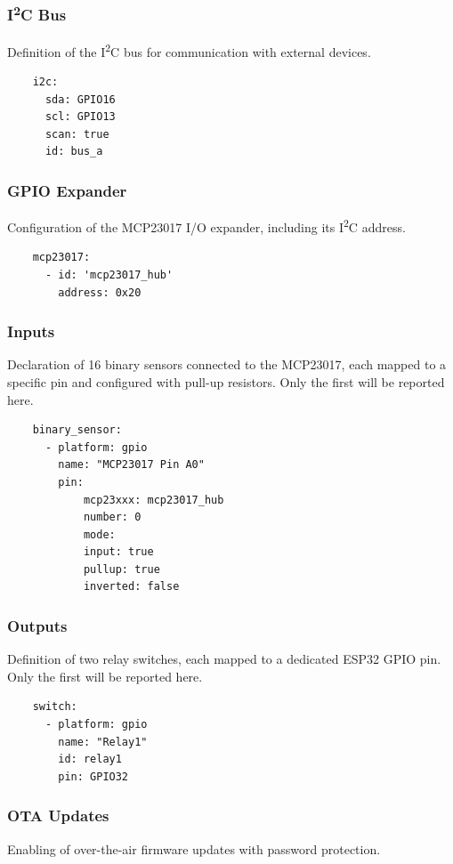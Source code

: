 \documentclass[a4paper,12pt]{article}
\begin{document}
\subsubsection{I\textsuperscript{2}C Bus}
Definition of the I\textsuperscript{2}C bus for communication with external devices.

\begin{lstlisting}
    i2c:
      sda: GPIO16
      scl: GPIO13
      scan: true
      id: bus_a
\end{lstlisting}

\subsubsection{GPIO Expander}
Configuration of the MCP23017 I/O expander, including its I\textsuperscript{2}C address.

\begin{lstlisting}
    mcp23017:   
      - id: 'mcp23017_hub'
        address: 0x20
\end{lstlisting}


\subsubsection{Inputs}
Declaration of 16 binary sensors connected to the MCP23017, each mapped to a specific pin and configured with pull-up resistors. Only the first will be reported here.

\begin{lstlisting}
    binary_sensor:
      - platform: gpio
        name: "MCP23017 Pin A0"
        pin:
            mcp23xxx: mcp23017_hub
            number: 0
            mode:
            input: true
            pullup: true
            inverted: false
\end{lstlisting}


\subsubsection{Outputs}
Definition of two relay switches, each mapped to a dedicated ESP32 GPIO pin. Only the first will be reported here.

\begin{lstlisting}
    switch:
      - platform: gpio
        name: "Relay1"
        id: relay1
        pin: GPIO32
\end{lstlisting}
    


\subsubsection{OTA Updates}
Enabling of over-the-air firmware updates with password protection.
\end{document}
